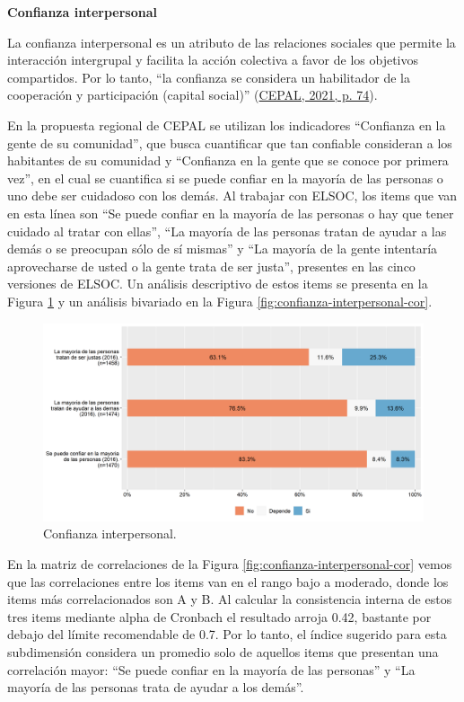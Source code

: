 \documentclass[
  12pt,
]{book}
\begin{document}
\textbf{Confianza interpersonal}

La confianza interpersonal es un atributo de las relaciones sociales que permite la interacción intergrupal y facilita la acción colectiva a favor de los objetivos compartidos. Por lo tanto, ``la confianza se considera un habilitador de la cooperación y participación (capital social)'' (\protect\hyperlink{ref-cepal_cohesion_2021}{CEPAL, 2021, p. 74}).

En la propuesta regional de CEPAL se utilizan los indicadores ``Confianza en la gente de su comunidad'', que busca cuantificar que tan confiable consideran a los habitantes de su comunidad y ``Confianza en la gente que se conoce por primera vez'', en el cual se cuantifica si se puede confiar en la mayoría de las personas o uno debe ser cuidadoso con los demás. Al trabajar con ELSOC, los items que van en esta línea son ``Se puede confiar en la mayoría de las personas o hay que tener cuidado al tratar con ellas'', ``La mayoría de las personas tratan de ayudar a las demás o se preocupan sólo de sí mismas'' y ``La mayoría de la gente intentaría aprovecharse de usted o la gente trata de ser justa'', presentes en las cinco versiones de ELSOC. Un análisis descriptivo de estos items se presenta en la Figura \ref{fig:confianza-interpersonal} y un análisis bivariado en la Figura \ref{fig:confianza-interpersonal-cor}.

\begin{figure}[H]

{\centering \includegraphics[width=1\linewidth,height=1\textheight]{output/graphs/confianza-interpersonal} 

}

\caption{Confianza interpersonal.}\label{fig:confianza-interpersonal}
\end{figure}

En la matriz de correlaciones de la Figura \ref{fig:confianza-interpersonal-cor} vemos que las correlaciones entre los items van en el rango bajo a moderado, donde los items más correlacionados son A y B. Al calcular la consistencia interna de estos tres items mediante alpha de Cronbach el resultado arroja 0.42, bastante por debajo del límite recomendable de 0.7. Por lo tanto, el índice sugerido para esta subdimensión considera un promedio solo de aquellos items que presentan una correlación mayor: ``Se puede confiar en la mayoría de las personas'' y ``La mayoría de las personas trata de ayudar a los demás''.
\end{document}

